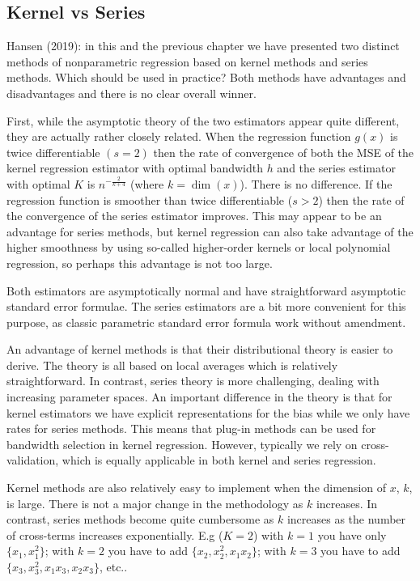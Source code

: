 \documentclass[12pt,]{book}
\begin{document}
\hypertarget{kernel-vs-series}{%
\subsection{Kernel vs Series}\label{kernel-vs-series}}

Hansen (2019): in this and the previous chapter we have presented two distinct methods of nonparametric regression based on kernel methods and series methods. Which should be used in practice? Both methods have advantages and disadvantages and there is no clear overall winner.

First, while the asymptotic theory of the two estimators appear quite different, they are actually rather closely related. When the regression function \(g(x)\) is twice differentiable \((s = 2)\) then the rate of convergence of both the MSE of the kernel regression estimator with optimal bandwidth \(h\) and the series estimator with optimal \(K\) is \(n^{-\frac{2}{k+4}}\) (where \(k = \dim(x)\)). There is no difference. If the regression function is smoother than twice differentiable (\(s > 2\)) then the rate of the convergence of the series estimator improves. This may appear to be an advantage for series methods, but kernel regression can also take advantage of the higher smoothness by using so-called higher-order kernels or local polynomial regression, so perhaps this advantage is not too large.

Both estimators are asymptotically normal and have straightforward asymptotic standard error formulae. The series estimators are a bit more convenient for this purpose, as classic parametric standard error formula work without amendment.

An advantage of kernel methods is that their distributional theory is easier to derive. The theory is all based on local averages which is relatively straightforward. In contrast, series theory is more challenging, dealing with increasing parameter spaces. An important difference in the theory is that for kernel estimators we have explicit representations for the bias while we only have rates for series methods. This means that plug-in methods can be used for bandwidth selection in kernel regression. However, typically we rely on cross-validation, which is equally applicable in both kernel and series regression.

Kernel methods are also relatively easy to implement when the dimension of \(x\), \(k\), is large. There is not a major change in the methodology as \(k\) increases. In contrast, series methods become quite cumbersome as \(k\) increases as the number of cross-terms increases exponentially. E.g (\(K=2\)) with \(k=1\) you have only \(\{x_1, x_1^2\}\); with \(k=2\) you have to add \(\{x_2, x_2^2, x_1 x_2 \}\); with \(k=3\) you have to add \(\{x_3, x_3^2, x_1 x_3, x_2 x_3\}\), etc..
\end{document}
